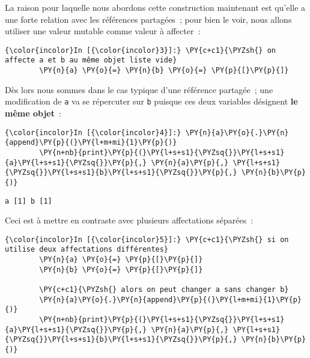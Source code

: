     La raison pour laquelle nous abordons cette construction maintenant est
qu'elle a une forte relation avec les références partagées~; pour bien
le voir, nous allons utiliser une valeur mutable comme valeur à
affecter~:

    \begin{Verbatim}[commandchars=\\\{\},frame=single,framerule=0.3mm,rulecolor=\color{cellframecolor}]
{\color{incolor}In [{\color{incolor}3}]:} \PY{c+c1}{\PYZsh{} on affecte a et b au même objet liste vide}
        \PY{n}{a} \PY{o}{=} \PY{n}{b} \PY{o}{=} \PY{p}{[}\PY{p}{]}
\end{Verbatim}


    Dès lors nous sommes dans le cas typique d'une référence partagée~; une
modification de \texttt{a} va se répercuter sur \texttt{b} puisque ces
deux variables désignent \textbf{le même objet}~:

    \begin{Verbatim}[commandchars=\\\{\},frame=single,framerule=0.3mm,rulecolor=\color{cellframecolor}]
{\color{incolor}In [{\color{incolor}4}]:} \PY{n}{a}\PY{o}{.}\PY{n}{append}\PY{p}{(}\PY{l+m+mi}{1}\PY{p}{)}
        \PY{n+nb}{print}\PY{p}{(}\PY{l+s+s1}{\PYZsq{}}\PY{l+s+s1}{a}\PY{l+s+s1}{\PYZsq{}}\PY{p}{,} \PY{n}{a}\PY{p}{,} \PY{l+s+s1}{\PYZsq{}}\PY{l+s+s1}{b}\PY{l+s+s1}{\PYZsq{}}\PY{p}{,} \PY{n}{b}\PY{p}{)}
\end{Verbatim}


    \begin{Verbatim}[commandchars=\\\{\},frame=single,framerule=0.3mm,rulecolor=\color{cellframecolor}]
a [1] b [1]
\end{Verbatim}

    Ceci est à mettre en contraste avec plusieurs affectations séparées~:

    \begin{Verbatim}[commandchars=\\\{\},frame=single,framerule=0.3mm,rulecolor=\color{cellframecolor}]
{\color{incolor}In [{\color{incolor}5}]:} \PY{c+c1}{\PYZsh{} si on utilise deux affectations différentes}
        \PY{n}{a} \PY{o}{=} \PY{p}{[}\PY{p}{]}
        \PY{n}{b} \PY{o}{=} \PY{p}{[}\PY{p}{]}
        
        \PY{c+c1}{\PYZsh{} alors on peut changer a sans changer b}
        \PY{n}{a}\PY{o}{.}\PY{n}{append}\PY{p}{(}\PY{l+m+mi}{1}\PY{p}{)}
        \PY{n+nb}{print}\PY{p}{(}\PY{l+s+s1}{\PYZsq{}}\PY{l+s+s1}{a}\PY{l+s+s1}{\PYZsq{}}\PY{p}{,} \PY{n}{a}\PY{p}{,} \PY{l+s+s1}{\PYZsq{}}\PY{l+s+s1}{b}\PY{l+s+s1}{\PYZsq{}}\PY{p}{,} \PY{n}{b}\PY{p}{)}
\end{Verbatim}


